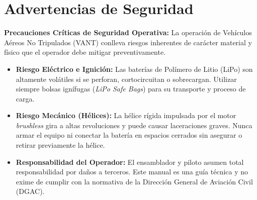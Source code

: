 \documentclass[11pt,a4paper]{article}
\begin{document}
\newpage
\tableofcontents
\newpage

\section*{Advertencias de Seguridad}
\begin{warningbox}
\textbf{\textcolor{warnred}{Precauciones Críticas de Seguridad Operativa:}} La operación de Vehículos Aéreos No Tripulados (VANT) conlleva riesgos inherentes de carácter material y físico que el operador debe mitigar preventivamente.

\begin{itemize}[leftmargin=*, itemsep=1ex]
    \item \textbf{Riesgo Eléctrico e Ignición:} Las baterías de Polímero de Litio (LiPo) son altamente volátiles si se perforan, cortocircuitan o sobrecargan. Utilizar siempre bolsas ignífugas (\textit{LiPo Safe Bags}) para su transporte y proceso de carga.
    \item \textbf{Riesgo Mecánico (Hélices):} La hélice rígida impulsada por el motor \textit{brushless} gira a altas revoluciones y puede causar laceraciones graves. Nunca armar el equipo ni conectar la batería en espacios cerrados sin asegurar o retirar previamente la hélice.
    \item \textbf{Responsabilidad del Operador:} El ensamblador y piloto asumen total responsabilidad por daños a terceros. Este manual es una guía técnica y no exime de cumplir con la normativa de la Dirección General de Aviación Civil (DGAC).
\end{itemize}
\end{warningbox}
\end{document}
